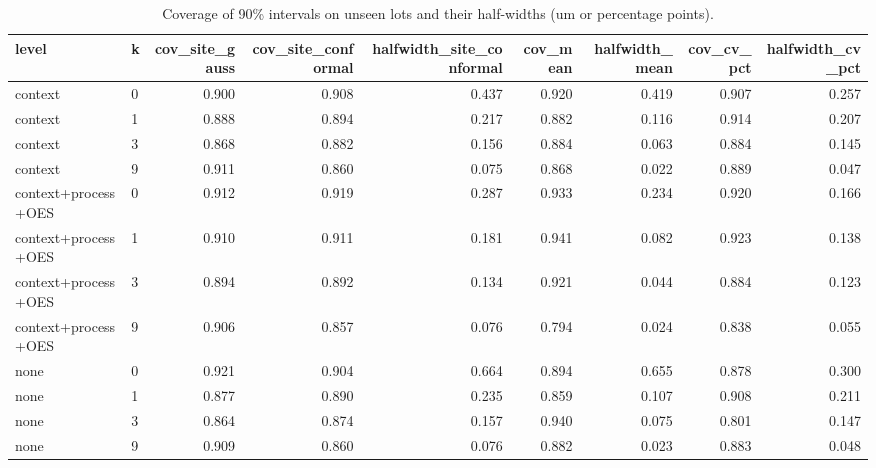 \begin{table}[t]
\centering
\caption{Coverage of 90\% intervals on unseen lots and their half-widths (um or percentage points).}
\label{tab:cal}
\footnotesize
\begin{tabular}{llrrrrrrr}
\toprule
level & k & cov\_site\_gauss & cov\_site\_conformal & halfwidth\_site\_conformal & cov\_mean & halfwidth\_mean & cov\_cv\_pct & halfwidth\_cv\_pct \\
\midrule
context & 0 & 0.900 & 0.908 & 0.437 & 0.920 & 0.419 & 0.907 & 0.257 \\
context & 1 & 0.888 & 0.894 & 0.217 & 0.882 & 0.116 & 0.914 & 0.207 \\
context & 3 & 0.868 & 0.882 & 0.156 & 0.884 & 0.063 & 0.884 & 0.145 \\
context & 9 & 0.911 & 0.860 & 0.075 & 0.868 & 0.022 & 0.889 & 0.047 \\
context+process+OES & 0 & 0.912 & 0.919 & 0.287 & 0.933 & 0.234 & 0.920 & 0.166 \\
context+process+OES & 1 & 0.910 & 0.911 & 0.181 & 0.941 & 0.082 & 0.923 & 0.138 \\
context+process+OES & 3 & 0.894 & 0.892 & 0.134 & 0.921 & 0.044 & 0.884 & 0.123 \\
context+process+OES & 9 & 0.906 & 0.857 & 0.076 & 0.794 & 0.024 & 0.838 & 0.055 \\
none & 0 & 0.921 & 0.904 & 0.664 & 0.894 & 0.655 & 0.878 & 0.300 \\
none & 1 & 0.877 & 0.890 & 0.235 & 0.859 & 0.107 & 0.908 & 0.211 \\
none & 3 & 0.864 & 0.874 & 0.157 & 0.940 & 0.075 & 0.801 & 0.147 \\
none & 9 & 0.909 & 0.860 & 0.076 & 0.882 & 0.023 & 0.883 & 0.048 \\
\bottomrule
\end{tabular}
\end{table}
